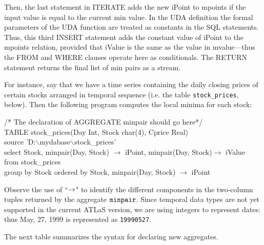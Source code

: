 Then, the last statement in {\cw ITERATE}
adds the new {\bw iPoint} to {\bw mpoints} if the
input value is equal to the current min value. In the UDA
definition the formal parameters of the UDA function are treated
as constants in the SQL statements. Thus, this third
{\cw INSERT} statement adds the constant value of {\bw iPoint}
to the {\bw mpoints} relation, provided that {\bw iValue} is the
same as the value
in {\bw mvalue}---thus the {\cw FROM} and {\cw WHERE} clauses
operate here as conditionals.
The {\cw RETURN} statement returns the final list of min pairs as a stream.

For instance, say that we have a time series containing the daily  closing
prices of certain stocks arranged in temporal sequence (i.e. the table {\tt stock\_prices},
below). Then the following program computes the local minima for each stock:

\begin{codedisplay}
\> /* The declaration of {AGGREGATE} minpair  should go here*/\\
\> TABLE stock\_prices(Day Int, Stock char(4), Cprice Real)\\
\hspace{6cm}source  'D:$\backslash$mydabase$\backslash$stock\_prices'\\

\>\>select Stock, minpair(Day, Stock) $\rightarrow$ iPoint, minpair(Day, Stock)$\rightarrow$  iValue \\
\>\>from stock\_prices\\
\>\>group by Stock  ordered by Stock, minpair(Day, Stock) $\rightarrow$ iPoint\\
\end{codedisplay}

Observe the use of  ``$\tt \rightarrow$" to identify the different
components in the two-column tuples returned by the aggregate $\tt minpair$.
Since temporal data types are not yet supported
in the current ATLaS version,
we are using integers to represent dates:
thus May, 27, 1999 is represented as {\tt 19990527}.

The next table summarizes the syntax for declaring new aggregates.

